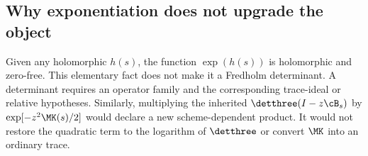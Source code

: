 \subsection{Why exponentiation does not upgrade the object}

Given any holomorphic \(h(s)\), the function \(\exp(h(s))\) is holomorphic
and zero-free.  This elementary fact does not make it a Fredholm determinant.
A determinant requires an operator family and the corresponding trace-ideal
or relative hypotheses.  Similarly, multiplying the inherited
\(\detthree(I-z\cB_s)\) by \(\exp[-z^2\MK(s)/2]\) would declare a new
scheme-dependent product.  It would not restore the quadratic term to the
logarithm of \(\detthree\) or convert \(\MK\) into an ordinary trace.
